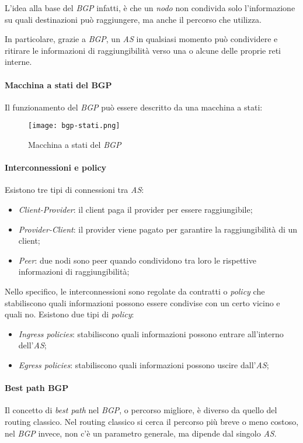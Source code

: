 \noindent
L'idea alla base del \emph{BGP} infatti, è che un \emph{nodo} non condivida solo
l'informazione su quali destinazioni può raggiungere, ma anche il percorso che
utilizza.

In particolare, grazie a \emph{BGP}, un \emph{AS} in qualsiasi momento può
condividere e ritirare le informazioni di raggiungibilità verso una o alcune
delle proprie reti interne.

\newpage
\paragraph{Macchina a stati del BGP}
Il funzionamento del \emph{BGP} può essere descritto da una macchina a stati:

\begin{figure}[h!]
    \centering
    \texttt{[image: bgp-stati.png]}
    \caption{Macchina a stati del \emph{BGP}}
\end{figure}

\paragraph{Interconnessioni e policy}
Esistono tre tipi di connessioni tra \emph{AS}:
\begin{itemize}
    \item \emph{Client-Provider}: il client paga il provider per essere
    raggiungibile;
    \item \emph{Provider-Client}: il provider viene pagato per garantire la
    raggiungibilità di un client;
    \item \emph{Peer}: due nodi sono peer quando condividono tra loro le
    rispettive informazioni di raggiungibilità;
\end{itemize}
Nello specifico, le interconnessioni sono regolate da contratti o \emph{policy}
che stabiliscono quali informazioni possono essere condivise con un certo 
vicino e quali no. Esistono due tipi di \emph{policy}:
\begin{itemize}
    \item \emph{Ingress policies}: stabiliscono quali informazioni possono entrare
    all'interno dell'\emph{AS};
    \item \emph{Egress policies}: stabiliscono quali informazioni possono uscire
    dall'\emph{AS};
\end{itemize}

\paragraph{Best path BGP}
Il concetto di \emph{best path} nel \emph{BGP}, o percorso migliore, è diverso
da quello del routing classico. Nel routing classico si cerca il percorso più
breve o meno costoso, nel \emph{BGP} invece, non c'è un parametro generale, ma
dipende dal singolo \emph{AS}.

